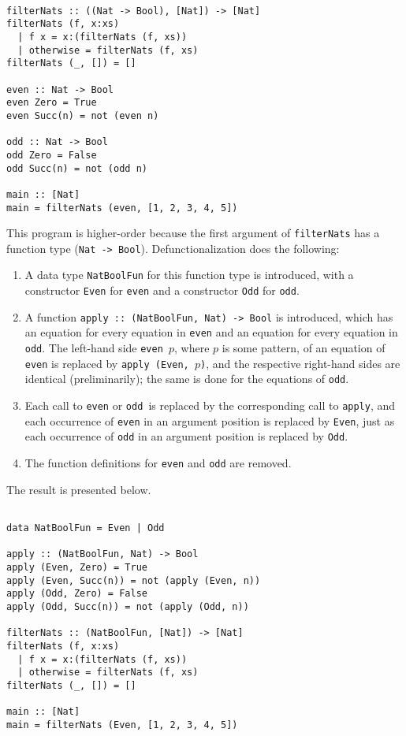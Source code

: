 \begin{lstlisting}

filterNats :: ((Nat -> Bool), [Nat]) -> [Nat]
filterNats (f, x:xs)
  | f x = x:(filterNats (f, xs))
  | otherwise = filterNats (f, xs)
filterNats (_, []) = []

even :: Nat -> Bool
even Zero = True
even Succ(n) = not (even n)

odd :: Nat -> Bool
odd Zero = False
odd Succ(n) = not (odd n)

main :: [Nat]
main = filterNats (even, [1, 2, 3, 4, 5])

\end{lstlisting}

This program is higher-order because the first argument of \texttt{filterNats} has a function type (\texttt{Nat -> Bool}). Defunctionalization does the following:
\begin{enumerate}
\item  A data type \texttt{NatBoolFun} for this function type is introduced, with a constructor \texttt{Even} for \texttt{even} and a constructor \texttt{Odd} for \texttt{odd}.
\item A function \texttt{apply :: (NatBoolFun, Nat) -> Bool} is introduced, which has an equation for every equation in \texttt{even} and an equation for every equation in \texttt{odd}. The left-hand side \texttt{even $p$}, where $p$ is some pattern, of an equation of \texttt{even} is replaced by \texttt{apply (Even, $p$)}, and the respective right-hand sides are identical (preliminarily); the same is done for the equations of \texttt{odd}.
\item Each call to \texttt{even} or \texttt{odd }is replaced by the corresponding call to \texttt{apply}, and each occurrence of \texttt{even} in an argument position is replaced by \texttt{Even}, just as each occurrence of \texttt{odd} in an argument position is replaced by \texttt{Odd}.
\item The function definitions for \texttt{even} and \texttt{odd} are removed.
\end{enumerate}
The result is presented below.

\begin{lstlisting}

data NatBoolFun = Even | Odd

apply :: (NatBoolFun, Nat) -> Bool
apply (Even, Zero) = True
apply (Even, Succ(n)) = not (apply (Even, n))
apply (Odd, Zero) = False
apply (Odd, Succ(n)) = not (apply (Odd, n))

filterNats :: (NatBoolFun, [Nat]) -> [Nat]
filterNats (f, x:xs)
  | f x = x:(filterNats (f, xs))
  | otherwise = filterNats (f, xs)
filterNats (_, []) = []

main :: [Nat]
main = filterNats (Even, [1, 2, 3, 4, 5])

\end{lstlisting}

